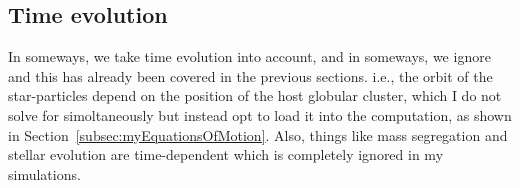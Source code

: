     \subsection{Time evolution}
        In someways, we take time evolution into account, and in someways, we ignore and this has already been covered in the previous sections. i.e., the orbit of the star-particles depend on the position of the host globular cluster, which I do not solve for simoltaneously but instead opt to load it into the computation, as shown in Section~\ref{subsec:myEquationsOfMotion}. Also, things like mass segregation and stellar evolution are time-dependent which is completely ignored in my simulations. 

